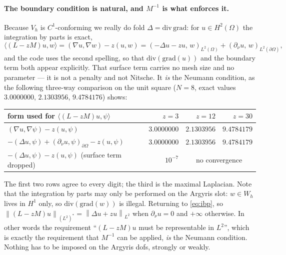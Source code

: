 \documentclass[11pt,a4paper]{article}
\newcommand{\norm}[1]{\left\|#1\right\|}
\begin{document}
\paragraph{The boundary condition is natural, and $M^{-1}$ is what enforces it.}
Because $V_h$ is $C^1$-conforming we really do fold $\Delta = \mathrm{div}\,\mathrm{grad}$:
for $u \in H^2(\Omega)$ the integration by parts is exact,
\begin{equation}\label{eq:ibp}
  \langle (L-zM)u, w\rangle = (\nabla u, \nabla w) - z(u,w)
   = (-\Delta u - zu,\, w)_{L^2(\Omega)}
   + (\partial_\nu u,\, w)_{L^2(\partial\Omega)},
\end{equation}
and the code uses the second spelling, so that $\mathrm{div}(\mathrm{grad}(u))$
and the boundary term both appear explicitly. That surface term carries no mesh
size and no parameter --- it is not a penalty and not Nitsche. It \emph{is} the
Neumann condition, as the following three-way comparison on the unit square
($N=8$, exact values $3.0000000$, $2.1303956$, $9.4784176$) shows:
\begin{center}\small
\begin{tabular}{lrrr}
\hline
form used for $\langle (L-zM)u,\psi\rangle$ & $z=3$ & $z=12$ & $z=30$ \\
\hline
$(\nabla u,\nabla\psi) - z(u,\psi)$                                    & $3.0000000$ & $2.1303956$ & $9.4784179$ \\
$-(\Delta u,\psi) + (\partial_\nu u,\psi)_{\partial\Omega} - z(u,\psi)$ & $3.0000000$ & $2.1303956$ & $9.4784179$ \\
$-(\Delta u,\psi) - z(u,\psi)$ \quad (surface term dropped)             & $10^{-7}$   & \multicolumn{2}{c}{no convergence} \\
\hline
\end{tabular}
\end{center}
The first two rows agree to every digit; the third is the maximal Laplacian.
Note that the integration by parts may only be performed on the Argyris slot:
$w \in W_h$ lives in $H^1$ only, so $\mathrm{div}(\mathrm{grad}(w))$ is illegal.
Returning to \eqref{eq:ibp},
so $\norm{(L-zM)u}_{(L^2)^*} = \norm{\Delta u + zu}_{L^2}$ when
$\partial_\nu u = 0$ and $+\infty$ otherwise. In other words the requirement
``$(L-zM)u$ must be representable in $L^2$'', which is exactly the requirement
that $M^{-1}$ can be applied, \emph{is} the Neumann condition. Nothing has to
be imposed on the Argyris dofs, strongly or weakly.
\end{document}
